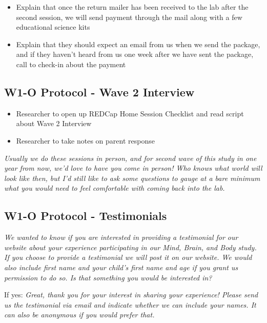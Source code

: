 \documentclass[]{book}
\providecommand{\tightlist}{%
  \setlength{\itemsep}{0pt}\setlength{\parskip}{0pt}}
\begin{document}
\begin{itemize}
\tightlist
\item
  Explain that once the return mailer has been received to the lab after the second session, we will send payment through the mail along with a few educational science kits
\item
  Explain that they should expect an email from us when we send the package, and if they haven't heard from us one week after we have sent the package, call to check-in about the payment
\end{itemize}

\hypertarget{w1-o-protocol---wave-2-interview}{%
\subsection{W1-O Protocol - Wave 2 Interview}\label{w1-o-protocol---wave-2-interview}}

\begin{itemize}
\tightlist
\item
  Researcher to open up REDCap Home Session Checklist and read script about Wave 2 Interview
\item
  Researcher to take notes on parent response
\end{itemize}

\emph{Usually we do these sessions in person, and for second wave of this study in one year from now, we'd love to have you come in person! Who knows what world will look like then, but I'd still like to ask some questions to gauge at a bare minimum what you would need to feel comfortable with coming back into the lab.}

\hypertarget{w1-o-protocol---testimonials}{%
\subsection{W1-O Protocol - Testimonials}\label{w1-o-protocol---testimonials}}

\emph{We wanted to know if you are interested in providing a testimonial for our website about your experience participating in our Mind, Brain, and Body study. If you choose to provide a testimonial we will post it on our website. We would also include first name and your child's first name and age if you grant us permission to do so. Is that something you would be interested in?}

If yes: \emph{Great, thank you for your interest in sharing your experience! Please send us the testimonial via email and indicate whether we can include your names. It can also be anonymous if you would prefer that.}
\end{document}
